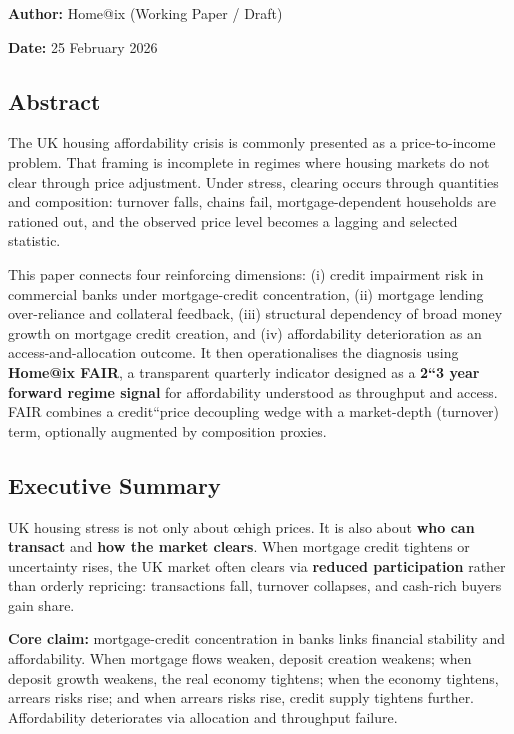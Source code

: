 \documentclass[
]{article}
\begin{document}
\textbf{Author:} Home@ix (Working Paper / Draft)

\textbf{Date:} 25 February 2026

\subsection{Abstract}\label{abstract}

The UK housing affordability crisis is commonly presented as a
price-to-income problem. That framing is incomplete in regimes where
housing markets do not clear through price adjustment. Under stress,
clearing occurs through quantities and composition: turnover falls,
chains fail, mortgage-dependent households are rationed out, and the
observed price level becomes a lagging and selected statistic.

This paper connects four reinforcing dimensions: (i) credit impairment
risk in commercial banks under mortgage-credit concentration, (ii)
mortgage lending over-reliance and collateral feedback, (iii) structural
dependency of broad money growth on mortgage credit creation, and (iv)
affordability deterioration as an access-and-allocation outcome. It then
operationalises the diagnosis using \textbf{Home@ix FAIR}, a transparent
quarterly indicator designed as a \textbf{2``3 year forward regime
signal} for affordability understood as throughput and access. FAIR
combines a credit``price decoupling wedge with a market-depth (turnover)
term, optionally augmented by composition proxies.

\subsection{Executive Summary}\label{executive-summary}

UK housing stress is not only about œhigh prices. It is also about
\textbf{who can transact} and \textbf{how the market clears}. When
mortgage credit tightens or uncertainty rises, the UK market often
clears via \textbf{reduced participation} rather than orderly repricing:
transactions fall, turnover collapses, and cash-rich buyers gain share.

\textbf{Core claim:} mortgage-credit concentration in banks links
financial stability and affordability. When mortgage flows weaken,
deposit creation weakens; when deposit growth weakens, the real economy
tightens; when the economy tightens, arrears risks rise; and when
arrears risks rise, credit supply tightens further. Affordability
deteriorates via allocation and throughput failure.
\end{document}

